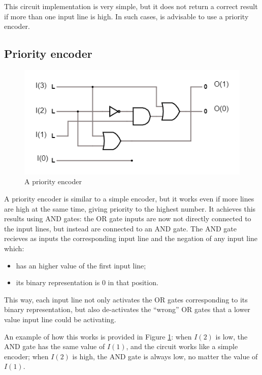 \documentclass{article}
\begin{document}
This circuit implementation is very simple, but it does not return a correct result if more than one input line is high. In such cases, is advisable to use a priority encoder.

\clearpage

\subsection{Priority encoder}

\begin{figure}[h]
  \centering
  \includegraphics[scale=0.7]{priority_encoder}
  \caption{A priority encoder}
  \label{priority_encoder}
\end{figure}

A priority encoder is similar to a simple encoder, but it works even if more lines are high at the same time, giving priority to the highest number. It achieves this results using AND gates: the OR gate inputs are now not directly connected to the input lines, but instead are connected to an AND gate. The AND gate recieves as inputs the corresponding input line and the negation of any input line which:

\begin{itemize}
\item has an higher value of the first input line;
\item its binary representation is 0 in that position.
\end{itemize}

This way, each input line not only activates the OR gates corresponding to its binary representation, but also de-activates the ``wrong'' OR gates that a lower value input line could be activating.

An example of how this works is provided in Figure \ref{priority_encoder}: when $I(2)$ is low, the AND gate has the same value of $I(1)$, and the circuit works like a simple encoder; when $I(2)$ is high, the AND gate is always low, no matter the value of $I(1)$.
\end{document}
